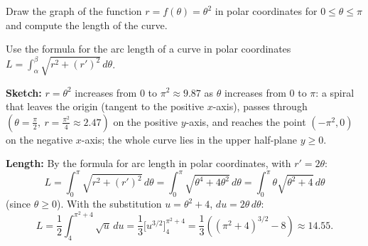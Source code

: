 
\begin{question}
Draw the graph of the function $r=f(\theta)=\theta^2$ in polar coordinates for $0\le\theta\le\pi$ and compute the length of the curve.
\end{question}

\begin{hint}
Use the formula for the arc length of a curve in polar coordinates $L=\int_\alpha^\beta\sqrt{r^2+(r')^2}\,d\theta$.
\end{hint}

\begin{solution}
\textbf{Sketch:} $r=\theta^2$ increases from $0$ to $\pi^2\approx9.87$ as $\theta$ increases from $0$ to $\pi$: a spiral that leaves the origin (tangent to the positive $x$-axis), passes through $\left(\theta=\frac\pi2,\ r=\frac{\pi^2}4\approx2.47\right)$ on the positive $y$-axis, and reaches the point $(-\pi^2,0)$ on the negative $x$-axis; the whole curve lies in the upper half-plane $y\ge0$.

\textbf{Length:} By the formula for arc length in polar coordinates, with $r'=2\theta$:
\[
L=\int_0^\pi\sqrt{r^2+(r')^2}\,d\theta=\int_0^\pi\sqrt{\theta^4+4\theta^2}\,d\theta=\int_0^\pi\theta\sqrt{\theta^2+4}\,d\theta
\]
(since $\theta\ge0$). With the substitution $u=\theta^2+4$, $du=2\theta\,d\theta$:
\[
L=\frac12\int_4^{\pi^2+4}\sqrt u\,du=\frac13\Big[u^{3/2}\Big]_4^{\pi^2+4}=\frac13\left((\pi^2+4)^{3/2}-8\right)\approx14.55.
\]
\end{solution}
